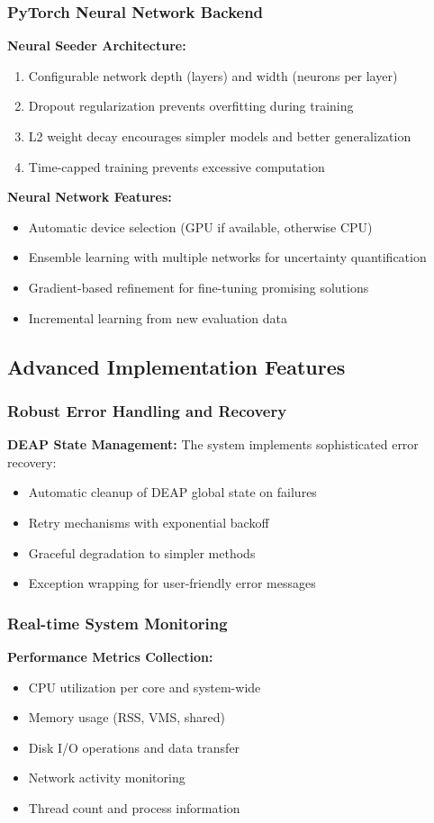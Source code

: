\documentclass[12pt,a4paper]{article}
\begin{document}
\subsubsection{PyTorch Neural Network Backend}
\textbf{Neural Seeder Architecture:}
\begin{enumerate}
\item Configurable network depth (layers) and width (neurons per layer)
\item Dropout regularization prevents overfitting during training
\item L2 weight decay encourages simpler models and better generalization
\item Time-capped training prevents excessive computation
\end{enumerate}

\textbf{Neural Network Features:}
\begin{itemize}
\item Automatic device selection (GPU if available, otherwise CPU)
\item Ensemble learning with multiple networks for uncertainty quantification
\item Gradient-based refinement for fine-tuning promising solutions
\item Incremental learning from new evaluation data
\end{itemize}

\subsection{Advanced Implementation Features}

\subsubsection{Robust Error Handling and Recovery}
\textbf{DEAP State Management:}
The system implements sophisticated error recovery:
\begin{itemize}
\item Automatic cleanup of DEAP global state on failures
\item Retry mechanisms with exponential backoff
\item Graceful degradation to simpler methods
\item Exception wrapping for user-friendly error messages
\end{itemize}

\subsubsection{Real-time System Monitoring}
\textbf{Performance Metrics Collection:}
\begin{itemize}
\item CPU utilization per core and system-wide
\item Memory usage (RSS, VMS, shared)
\item Disk I/O operations and data transfer
\item Network activity monitoring
\item Thread count and process information
\end{itemize}
\end{document}
